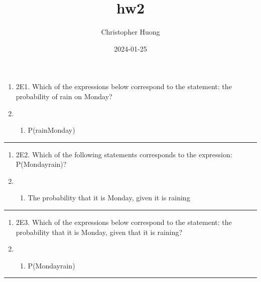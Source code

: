 \documentclass[
]{article}
\title{hw2}
\author{Christopher Huong}
\date{2024-01-25}
\providecommand{\tightlist}{%
  \setlength{\itemsep}{0pt}\setlength{\parskip}{0pt}}
\begin{document}
\maketitle

\begin{enumerate}
\def\labelenumi{\Alph{enumi})}
\setcounter{enumi}{16}
\item
  2E1. Which of the expressions below correspond to the statement: the
  probability of rain on Monday?
\item
  \begin{enumerate}
  \def\labelenumii{(\arabic{enumii})}
  \tightlist
  \item
    P(rain\textbar Monday)
  \end{enumerate}
\end{enumerate}

\begin{center}\rule{0.5\linewidth}{0.5pt}\end{center}

\begin{enumerate}
\def\labelenumi{\Alph{enumi})}
\setcounter{enumi}{16}
\item
  2E2. Which of the following statements corresponds to the expression:
  P(Monday\textbar rain)?
\item
  \begin{enumerate}
  \def\labelenumii{(\arabic{enumii})}
  \setcounter{enumii}{2}
  \tightlist
  \item
    The probability that it is Monday, given it is raining
  \end{enumerate}
\end{enumerate}

\begin{center}\rule{0.5\linewidth}{0.5pt}\end{center}

\begin{enumerate}
\def\labelenumi{\Alph{enumi})}
\setcounter{enumi}{16}
\item
  2E3. Which of the expressions below correspond to the statement: the
  probability that it is Monday, given that it is raining?
\item
  \begin{enumerate}
  \def\labelenumii{(\arabic{enumii})}
  \tightlist
  \item
    P(Monday\textbar rain)
  \end{enumerate}
\end{enumerate}

\begin{center}\rule{0.5\linewidth}{0.5pt}\end{center}
\end{document}
